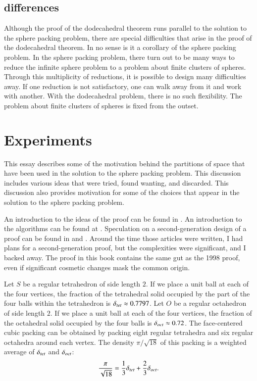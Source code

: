 \subsection{differences}

Although the proof of the dodecahedral theorem runs parallel
to the solution to the sphere packing problem, there are special
difficulties that arise in the proof of the dodecahedral theorem.
In no sense is it a corollary of the sphere packing problem.
In the sphere packing problem, there turn out to be many ways to
reduce the infinite sphere problem to a problem about finite clusters
of spheres.  Through this multiplicity of reductions, it is
possible to design many difficulties away.  If one reduction is
not satisfactory, one can walk away from it and work with
another.
With the dodecahedral problem, there is no such flexibility.
The problem about finite clusters of spheres is fixed from the outset.

\clearpage






\section{Experiments}

\label{sec:experiment}





This essay describes some of the
motivation behind the partitions of space that have been used in the
solution to the sphere packing problem.  This discussion includes various
ideas that were tried, found wanting, and discarded. This
discussion also provides motivation for some of the choices that appear
in the solution to the sphere packing problem.

An introduction to the ideas of the proof can be found in
\cite{CH}. An introduction to the algorithms can be found at
\cite{algorithm}. Speculation on a second-generation design of a
proof can be found in \cite{algorithm} and \cite{arbeitstagung}.
Around the time those articles were written, I had plans for
a second-generation proof, but the complexities were significant,
and I backed away.  The proof in this book contains the same gut
as the 1998 proof, even if significant  cosmetic changes 
mask the common origin.



Let $S$ be a regular tetrahedron of side length $2$.  If we place a
unit ball at each of the four vertices, the fraction of the
tetrahedral solid occupied by the part of the four balls within the
tetrahedron is $\delta_{tet}\approx 0.7797$. Let $O$ be a regular
octahedron of side length $2$.  If we place a unit ball at each of
the four vertices, the fraction of the octahedral solid occupied by
the four balls is $\delta_{oct}\approx 0.72$. The face-centered cubic
packing can be obtained by packing eight regular tetrahedra and six
regular octahedra around each vertex. The density $\pi/\sqrt{18}$ of
this packing is a weighted average of $\delta_{tet}$ and $\delta_{oct}$:
    $$\frac\pi{\sqrt{18}} = \frac13\delta_{tet} + \frac23\delta_{oct}.$$

